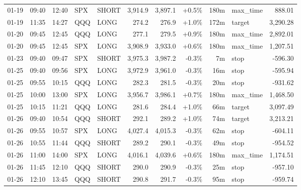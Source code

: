 \documentclass[11pt,a4paper,twoside]{article}
\begin{document}
\begin{center}
\begin{longtable}{>{\color{txtmain}}l l l l l r r r r >{\color{txtmain}}l r}
01-19 & 09:40 & 12:40 & SPX & SHORT & 3,914.9 & 3,897.1 & \textcolor{wingreen}{+0.5\%} & 180m & max\_time & \textcolor{wingreen}{888.01} \\
01-19 & 11:35 & 14:27 & QQQ & LONG & 274.2 & 276.9 & \textcolor{wingreen}{+1.0\%} & 172m & target & \textcolor{wingreen}{3,290.28} \\
01-20 & 09:45 & 12:45 & QQQ & LONG & 277.1 & 279.5 & \textcolor{wingreen}{+0.9\%} & 180m & max\_time & \textcolor{wingreen}{2,892.01} \\
01-20 & 09:45 & 12:45 & SPX & LONG & 3,908.9 & 3,933.0 & \textcolor{wingreen}{+0.6\%} & 180m & max\_time & \textcolor{wingreen}{1,207.51} \\
01-23 & 09:40 & 09:47 & SPX & SHORT & 3,975.3 & 3,987.2 & \textcolor{lossred}{-0.3\%} & 7m & stop & \textcolor{lossred}{-596.30} \\
01-25 & 09:40 & 09:56 & SPX & LONG & 3,972.9 & 3,961.0 & \textcolor{lossred}{-0.3\%} & 16m & stop & \textcolor{lossred}{-595.94} \\
01-25 & 09:55 & 10:15 & QQQ & LONG & 282.3 & 281.5 & \textcolor{lossred}{-0.3\%} & 20m & stop & \textcolor{lossred}{-931.62} \\
01-25 & 10:00 & 13:00 & SPX & LONG & 3,956.7 & 3,986.1 & \textcolor{wingreen}{+0.7\%} & 180m & max\_time & \textcolor{wingreen}{1,468.50} \\
01-25 & 10:15 & 11:21 & QQQ & LONG & 281.6 & 284.4 & \textcolor{wingreen}{+1.0\%} & 66m & target & \textcolor{wingreen}{3,097.49} \\
01-26 & 09:40 & 10:54 & QQQ & SHORT & 292.1 & 289.2 & \textcolor{wingreen}{+1.0\%} & 74m & target & \textcolor{wingreen}{3,213.21} \\
01-26 & 09:55 & 10:57 & SPX & LONG & 4,027.4 & 4,015.3 & \textcolor{lossred}{-0.3\%} & 62m & stop & \textcolor{lossred}{-604.11} \\
01-26 & 10:55 & 11:44 & QQQ & SHORT & 289.2 & 290.1 & \textcolor{lossred}{-0.3\%} & 49m & stop & \textcolor{lossred}{-954.52} \\
01-26 & 11:00 & 14:00 & SPX & LONG & 4,016.1 & 4,039.6 & \textcolor{wingreen}{+0.6\%} & 180m & max\_time & \textcolor{wingreen}{1,174.51} \\
01-26 & 11:45 & 12:10 & QQQ & SHORT & 290.0 & 290.9 & \textcolor{lossred}{-0.3\%} & 25m & stop & \textcolor{lossred}{-957.10} \\
01-26 & 12:10 & 13:45 & QQQ & SHORT & 290.8 & 291.7 & \textcolor{lossred}{-0.3\%} & 95m & stop & \textcolor{lossred}{-959.74} \\

\end{longtable}
\end{center}
\end{document}

